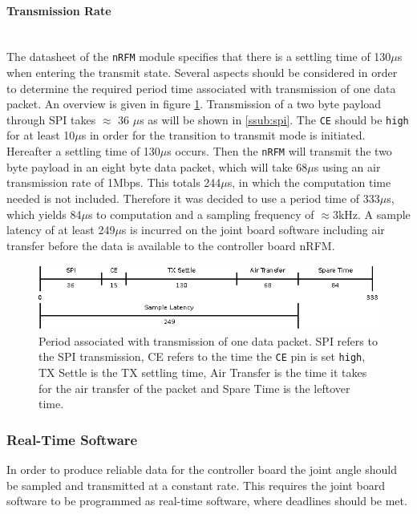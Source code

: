 \paragraph{Transmission Rate} %
\label{par:transmission_rate}~\\
The datasheet of the \texttt{nRFM} module specifies that there is a settling time of 130$\mu$s when entering the transmit state.
Several aspects should be considered in order to determine the required period time associated with transmission of one data packet.
An overview is given in figure \ref{fig:tiny_period}.
Transmission of a two byte payload through SPI takes $\approx$ 36 $\mu$s as will be shown in \ref{ssub:spi}.
The \texttt{CE} should be \texttt{high} for at least 10$\mu$s in order for the transition to transmit mode is initiated.
Hereafter a settling time of 130$\mu$s occurs.
Then the \texttt{nRFM} will transmit the two byte payload in an eight byte data packet, which will take 68$\mu$s using an air transmission rate of 1Mbps.
This totals 244$\mu$s, in which the computation time needed is not included.
Therefore it was decided to use a period time of 333$\mu$s, which yields 84$\mu$s to computation and a sampling frequency of $\approx$3kHz.
A sample latency of at least 249$\mu$s is incurred on the joint board software including air transfer before the data is available to the controller board nRFM.
\begin{figure}[h]
	\centering
	\includegraphics[width=1\linewidth]{graphics/latency_diagram}
	\caption[Period of wireless transmission]{Period associated with transmission of one data packet. SPI refers to the SPI transmission, CE refers to the time the \texttt{CE} pin is set \texttt{high}, TX Settle is the TX settling time, Air Transfer is the time it takes for the air transfer of the packet and Spare Time is the leftover time.}
	\label{fig:tiny_period}
\end{figure}

\subsubsection{Real-Time Software}
In order to produce reliable data for the controller board the joint angle should be sampled and transmitted at a constant rate.
This requires the joint board software to be programmed as real-time software, where deadlines should be met.


